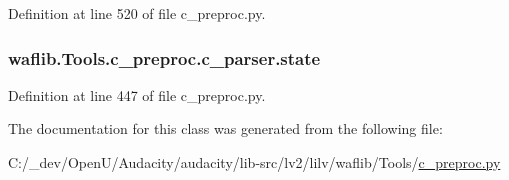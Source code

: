 Definition at line 520 of file c\+\_\+preproc.\+py.

\subsubsection[{\texorpdfstring{state}{state}}]{\setlength{\rightskip}{0pt plus 5cm}waflib.\+Tools.\+c\+\_\+preproc.\+c\+\_\+parser.\+state}\hypertarget{classwaflib_1_1_tools_1_1c__preproc_1_1c__parser_a1b75df8aefa5de8afe76ed1eadda9bc3}{}\label{classwaflib_1_1_tools_1_1c__preproc_1_1c__parser_a1b75df8aefa5de8afe76ed1eadda9bc3}


Definition at line 447 of file c\+\_\+preproc.\+py.



The documentation for this class was generated from the following file\+:\begin{DoxyCompactItemize}
\item 
C\+:/\+\_\+dev/\+Open\+U/\+Audacity/audacity/lib-\/src/lv2/lilv/waflib/\+Tools/\hyperlink{lilv_2waflib_2_tools_2c__preproc_8py}{c\+\_\+preproc.\+py}\end{DoxyCompactItemize}
